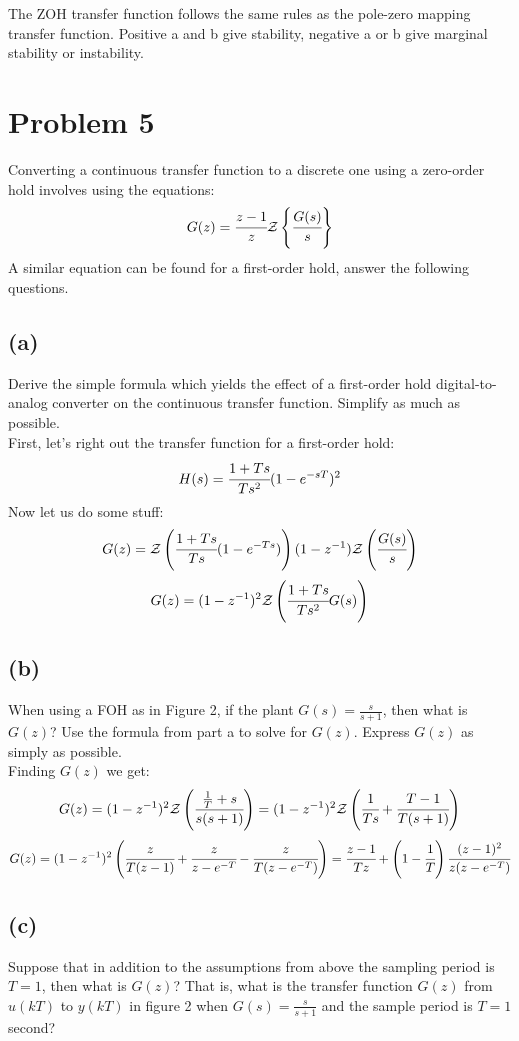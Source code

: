 \documentclass{article}
\begin{document}
The ZOH transfer function follows the same rules as the pole-zero mapping transfer function. Positive a and b give stability, negative a or b give marginal stability or instability.


\section*{Problem 5}
Converting a continuous transfer function to a discrete one using a zero-order hold involves using the equations:
\[G(z)=\cfrac{z-1}{z}\mathcal{Z}\left \{\cfrac{G(s)}{s}\right \}\]
A similar equation can be found for a first-order hold, answer the following questions.
\subsection*{(a)}
Derive the simple formula which yields the effect of a first-order hold digital-to-analog converter on the continuous transfer function. Simplify as much as possible.\\

First, let's right out the transfer function for a first-order hold:
\[H(s)=\cfrac{1+Ts}{Ts^2}(1-e^{-sT})^2\]
Now let us do some stuff:
\[G(z)=\mathcal{Z}\left ( \cfrac{1+Ts}{Ts}(1-e^{-Ts})\right )(1-z^{-1})\mathcal{Z}\left (\cfrac{G(s)}{s}\right )\]
\[G(z)=(1-z^{-1})^2\mathcal{Z}\left (\cfrac{1+Ts}{Ts^2}G(s)\right )\]


\subsection*{(b)}
When using a FOH as in Figure 2, if the plant $G(s)=\frac{s}{s+1}$, then what is $G(z)$? Use the formula from part a to solve for $G(z)$. Express $G(z)$ as simply as possible.\\

Finding $G(z)$ we get:
\[G(z)=(1-z^{-1})^2\mathcal{Z}\left (\cfrac{\frac{1}{T}+s}{s(s+1)}\right )=(1-z^{-1})^2\mathcal{Z}\left (\cfrac{1}{Ts}+\cfrac{T-1}{T(s+1)}\right )\]
\[G(z)=(1-z^{-1})^2\left (\cfrac{z}{T(z-1)}+\cfrac{z}{z-e^{-T}}-\cfrac{z}{T(z-e^{-T})}\right )=\cfrac{z-1}{Tz}+\left (1-\cfrac{1}{T}\right )\cfrac{(z-1)^2}{z(z-e^{-T})}\]

\subsection*{(c)}
Suppose that in addition to the assumptions from above the sampling period is $T=1$, then what is $G(z)$? That is, what is the transfer function $G(z)$ from $u(kT)$ to $y(kT)$ in figure 2 when $G(s)=\frac{s}{s+1}$ and the sample period is $T=1$ second?\\
\end{document}
